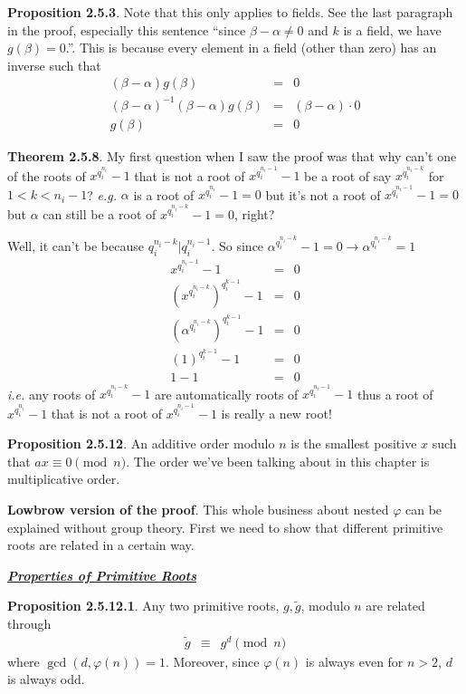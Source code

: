 \documentclass[aps,preprint,preprintnumbers,nofootinbib,showpacs,prd]{revtex4-1}
\newcommand{\ie}{{\it i.e.} }
\newcommand{\eg}{{\it e.g.} }
\newcommand{\nbea}{\begin{eqnarray*}}
\newcommand{\neea}{\end{eqnarray*}}
\begin{document}
{\bf Proposition 2.5.3}. Note that this only applies to fields. See the last paragraph in the proof, especially this sentence ``since $\beta-\alpha \neq 0$ and $k$ is a field, we have $g(\beta)=0$.''. This is because every element in a field (other than zero) has an inverse such that
%
\nbea
(\beta - \alpha)g(\beta) & = & 0 \\
(\beta - \alpha)^{-1}(\beta - \alpha)g(\beta) & = & (\beta - \alpha) \cdot 0 \\
g(\beta) & = & 0
\neea
%

{\bf Theorem 2.5.8}. My first question when I saw the proof was that why can't one of the roots of $x^{q_i^{n_i}} - 1$ that is not a root of $x^{q_i^{n_i - 1}} - 1$ be a root of say $x^{q_i^{n_i - k}}$ for $1 < k < n_i - 1$? \eg $\alpha$ is a root of $x^{q_i^{n_i}} - 1 = 0$ but it's not a root of $x^{q_i^{n_i - 1}} - 1 = 0$ but $\alpha$ can still be a root of $x^{q_i^{n_i - k}} -1 = 0$, right?

Well, it can't be because $q_i^{n_i - k} | q_i^{n_i-1}$. So since $\alpha^{q_i^{n_i - k}} -1 = 0 \to \alpha^{q_i^{n_i - k}} = 1$
%
\nbea
x^{q_i^{n_i-1}} - 1 & = & 0 \\
\left (x^{q_i^{n_i-k}} \right )^{q_i^{k-1}} - 1 & = & 0 \\
\left (\alpha^{q_i^{n_i-k}} \right )^{q_i^{k-1}} - 1 & = & 0 \\
\left (1 \right )^{q_i^{k-1}} - 1 & = & 0 \\
1-1 & = & 0
\neea
%
\ie any roots of $x^{q_i^{n_i - k}} - 1$ are automatically roots of $x^{q_i^{n_i - 1}} - 1$ thus a root of $x^{q_i^{n_i}} - 1$ that is not a root of $x^{q_i^{n_i - 1}} - 1$ is really a new root!

{\bf Proposition 2.5.12}. An additive order modulo $n$ is the smallest positive $x$ such that $ax \equiv 0 \pmod{n}$. The order we've been talking about in this chapter is multiplicative order.

{\bf Lowbrow version of the proof}. This whole business about nested $\varphi$ can be explained without group theory. First we need to show that different primitive roots are related in a certain way.

\bigskip
\underline{\textbf{\textit{Properties of Primitive Roots}}}
\bigskip

{\bf Proposition 2.5.12.1}. Any two primitive roots, $g, \tilde g$, modulo $n$ are related through
%
\nbea
\tilde g & \equiv & g^{d} \pmod{n}
\neea
%
where $\gcd(d, \varphi(n)) = 1$. Moreover, since $\varphi(n)$ is always even for $n > 2$, $d$ is always odd.
\end{document}
